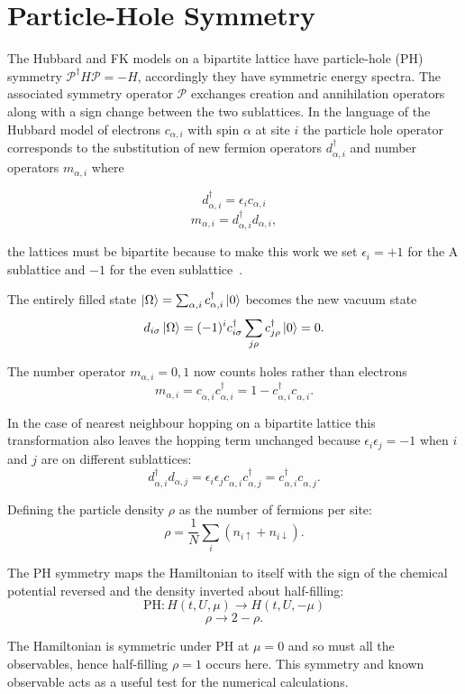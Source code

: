 \hypertarget{particle-hole-symmetry}{%
\section{Particle-Hole Symmetry}\label{particle-hole-symmetry}}

The Hubbard and FK models on a bipartite lattice have particle-hole (PH) symmetry \(\mathcal{P}^\dagger H \mathcal{P} = - H\), accordingly they have symmetric energy spectra. The associated symmetry operator \(\mathcal{P}\) exchanges creation and annihilation operators along with a sign change between the two sublattices. In the language of the Hubbard model of electrons \(c_{\alpha,i}\) with spin \(\alpha\) at site \(i\) the particle hole operator corresponds to the substitution of new fermion operators \(d^\dagger_{\alpha,i}\) and number operators \(m_{\alpha,i}\) where

\[d^\dagger_{\alpha,i} = \epsilon_i c_{\alpha,i}\] \[m_{\alpha,i} = d^\dagger_{\alpha,i}d_{\alpha,i},\]

the lattices must be bipartite because to make this work we set \(\epsilon_i = +1\) for the A sublattice and \(-1\) for the even sublattice~\autocite{gruberFalicovKimballModel2006}.

The entirely filled state \(\ket{\Omega} = \sum_{\alpha,i} c^\dagger_{\alpha,i} \ket{0}\) becomes the new vacuum state \[d_{i\sigma} \ket{\Omega} = (-1)^i c^\dagger_{i\sigma} \sum_{j\rho} c^\dagger_{j\rho} \ket{0} = 0.\]

The number operator \(m_{\alpha,i} = 0,1\) now counts holes rather than electrons \[ m_{\alpha,i} = c^{\phantom{\dagger}}_{\alpha,i} c^\dagger_{\alpha,i} = 1 - c^\dagger_{\alpha,i} c^{\phantom{\dagger}}_{\alpha,i}.\]

In the case of nearest neighbour hopping on a bipartite lattice this transformation also leaves the hopping term unchanged because \(\epsilon_i \epsilon_j = -1\) when \(i\) and \(j\) are on different sublattices: \[ d^\dagger_{\alpha,i} d_{\alpha,j} = \epsilon_i \epsilon_j c^{\phantom{\dagger}}_{\alpha,i} c^\dagger_{\alpha,j} = c^\dagger_{\alpha,i} c^{\phantom{\dagger}}_{\alpha,j}. \]

Defining the particle density \(\rho\) as the number of fermions per site: \[
    \rho = \frac{1}{N} \sum_i \left( n_{i \uparrow} + n_{i \downarrow} \right).
\]

The PH symmetry maps the Hamiltonian to itself with the sign of the chemical potential reversed and the density inverted about half-filling: \[ \text{PH} : H(t, U, \mu) \rightarrow H(t, U, -\mu) \] \[ \rho \rightarrow 2 - \rho. \]

The Hamiltonian is symmetric under PH at \(\mu = 0\) and so must all the observables, hence half-filling \(\rho = 1\) occurs here. This symmetry and known observable acts as a useful test for the numerical calculations.

